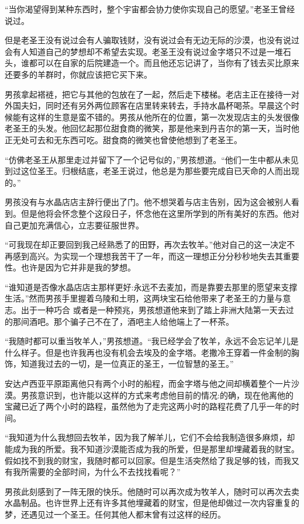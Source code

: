 \documentclass[twoside,openany]{book}
\begin{document}
“当你渴望得到某种东西时，整个宇宙都会协力使你实现自己的愿望。”老圣王曾经说过。

但是老圣王没有说过会有人骗取钱财，没有说过会有无边无际的沙漠，也没有说过会有人知道自己的梦想却不希望去实现。老圣王没有说过金字塔只不过是一堆石头，谁都可以在自家的后院建造一个。而且他还忘记讲了，当你有了钱去买比原来还要多的羊群时，你就应该把它买下来。

男孩拿起褡裢，把它与其他的包放在了一起，然后走下楼梯。老店主正在接待一对外国夫妇，同时还有另外两位顾客在店里转来转去，手持水晶杯喝茶。早晨这个时候能有这样的生意是蛮不错的。男孩从他所在的位置，第一次发现店主的头发很像老圣王的头发。他回忆起那位甜食商的微笑，那是他来到丹吉尔的第一天，当时他正无处可去和无东西可吃。甜食商的微笑也曾使他想到了老圣王。

“仿佛老圣王从那里走过并留下了一个记号似的，”男孩想道。“他们一生中都从未见到过这位圣王。归根结底，老圣王说过，他总是为那些要完成自已天命的人而出现的。”

男孩没有与水晶店店主辞行便出了门。他不想哭着与店主告别，因为这会被别人看到。但是他将会怀念整个这段日子，怀念他在这里所学到的所有美好的东西。他对自己更加充满信心，立志要征服世界。

“可我现在却正要回到我己经熟悉了的田野，再次去牧羊。”他对自己的这一决定不再感到高兴。为实现一个理想我苦干了一年，而这一理想正分分秒秒地失去其重要性。也许是因为它并非是我的梦想。

“谁知道是否像水晶店店主那样更好:永远不去麦加，而是靠要去那里的愿望来支撑生活。”然而男孩手里握着乌陵和土明，这两块宝石给他带来了老圣王的力量与意志。出于一种巧合 或者是一种预兆，男孩想道他来到了踏上非洲大陆第一天去过的那间酒吧。那个骗子己不在了，酒吧主人给他端上了一杯茶。

“我随时都可以重当牧羊人，”男孩想道。“我已经学会了牧羊，永远不会忘记羊儿是什么样子。但是也许我再也没有机会去埃及的金字塔。老撒冷王穿着一件金制的胸饰，知道我过去的一切，是一位真正的圣王，一位智慧的圣王。”

安达卢西亚平原距离他只有两个小时的船程，而金字塔与他之间却横着整个一片沙漠。男孩意识到，也许能以这样的方式来考虑他目前的情况:的确，现在他离他的宝藏已近了两个小时的路程，虽然他为了走完这两小时的路程花费了几乎一年的时间。

“我知道为什么我想回去牧羊，因为我了解羊儿，它们不会给我制造很多麻烦，却能成为我的所爱。我不知道沙漠能否成为我的所爱，但是那里却埋藏着我的财宝。假如找不到我的财宝，我随时都可以回家。但是生活突然给了我足够的钱，而我又有我所需要的全部时间，为什么不去找找看呢？”

男孩此刻感到了一阵无限的快乐。他随时可以再次成为牧羊人，随时可以再次去卖水晶制品。也许世界上还有许多其他埋藏着的财宝，但是他却做过一次内容重复的梦，还遇见过一个圣王。任何其他人都末曾有过这样的经历。
\end{document}
